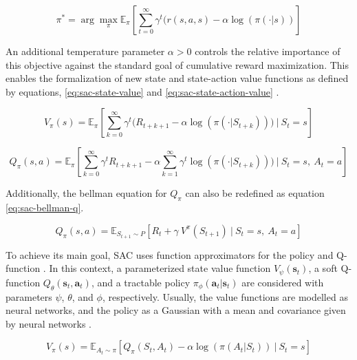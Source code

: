 \begin{equation} \label{eq:sac-opt-policy}
\pi^* = \arg \max_\pi \mathbb{E}_{\pi} [ \sum_{t=0}^\infty \gamma^t (r(s, a, s) - \alpha \log(\pi(\cdot|s))]
\end{equation} 

An additional temperature parameter $\alpha > 0$ controls the relative importance of this objective against the standard goal of cumulative reward maximization. This enables the formalization of new state and state-action value functions as defined by equations, \ref{eq:sac-state-value} and \ref{eq:sac-state-action-value} \cite{openaiSpinningDocumentation, haarnojaSoftActorCriticOffPolicy2018}.

\begin{equation} \label{eq:sac-state-value}
V_\pi(s) = \mathbb{E}_{\pi} \left[ \sum_{k=0}^\infty \gamma^t \Big(R_{t+k+1} - \alpha \log \left(\pi(\cdot | S_{t+k}) \right) \Big)\ \Bigg|\ S_t = s \right]
\end{equation} 

\begin{equation} \label{eq:sac-state-action-value}
Q_\pi (s,a) = \mathbb{E}_{\pi} \left[ \sum_{k=0}^\infty \gamma^t R_{t+k+1} - \alpha \sum_{k=1}^\infty \gamma^t \log (\pi(\cdot | S_{t+k})))\ \Bigg|\ S_t = s,\ A_t = a \right]
\end{equation} 

Additionally, the bellman equation for $Q_\pi$ can also be redefined as equation \ref{eq:sac-bellman-q}. \par

\begin{equation} \label{eq:sac-bellman-q}
Q_\pi(s,a) = \mathbb{E}_{S_{t+1} \sim P} \left[ R_t + \gamma\ V^\pi(S_{t+1})\ |\ S_t = s,\ A_t = a \right]
\end{equation} 

To achieve its main goal, \ac{SAC} uses function approximators for the policy and Q-function \cite{haarnojaSoftActorCriticOffPolicy2018}. In this context, a parameterized state value function $V_\psi(\mathbf{s}_t)$, a soft Q-function $Q_\theta (\mathbf{s}_t, \mathbf{a}_t)$, and a tractable policy $\pi_\phi (\mathbf{a}_t|\mathbf{s}_t)$ are considered with parameters $\psi$, $\theta$, and $\phi$, respectively. Usually, the value functions are modelled as neural networks, and the policy as a Gaussian with a mean and covariance given by neural networks \cite{haarnojaSoftActorCriticOffPolicy2018}.

\begin{equation} \label{eq:sac-bellman-vq}
V_\pi (s) = \mathbb{E}_{A_t \sim \pi} \left[ Q_\pi (S_t, A_t) - \alpha \log (\pi (A_t|S_t)) \ \Big|\ S_t = s \right] 
\end{equation}

